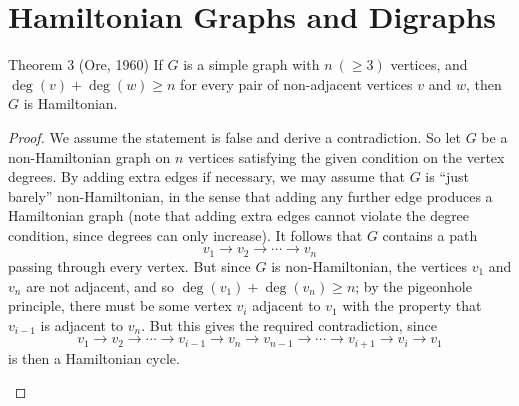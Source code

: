 \section{Hamiltonian Graphs and Digraphs}

\begin{thmbox}{{Theorem 3 (Ore, 1960)}}
If $G$ is a simple graph with $n\ (\geq 3)$ vertices, and $\deg(v) + \deg(w) \geq n$ for every pair of non-adjacent vertices $v$ and $w$, then $G$ is Hamiltonian.
\end{thmbox}

\begin{proof}
We assume the statement is false and derive a contradiction. So let $G$ be a non-Hamiltonian graph on $n$ vertices satisfying the given condition on the vertex degrees. By adding extra edges if necessary, we may assume that $G$ is ``just barely'' non-Hamiltonian, in the sense that adding any further edge produces a Hamiltonian graph (note that adding extra edges cannot violate the degree condition, since degrees can only increase). It follows that $G$ contains a path
$$v_1 \to v_2 \to \cdots \to v_n$$
passing through every vertex. But since $G$ is non-Hamiltonian, the vertices $v_1$ and $v_n$ are not adjacent, and so $\deg(v_1) + \deg(v_n) \geq n$; by the pigeonhole principle, there must be some vertex $v_i$ adjacent to $v_1$ with the property that $v_{i-1}$ is adjacent to $v_n$. But this gives the required contradiction, since
$$v_1 \to v_2 \to \cdots \to v_{i-1} \to v_n \to v_{n-1} \to \cdots \to v_{i+1} \to v_i \to v_1$$
is then a Hamiltonian cycle.

\begin{center}
\end{center}
\end{proof}

